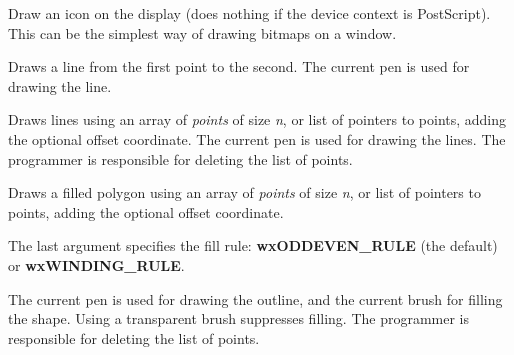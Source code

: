 \label{wxdcdrawicon}


Draw an icon on the display (does nothing if the device context is PostScript).
This can be the simplest way of drawing bitmaps on a window.

\label{wxdcdrawline}


Draws a line from the first point to the second. The current pen is used
for drawing the line.

\label{wxdcdrawlines}



Draws lines using an array of {\it points} of size {\it n}, or list of
pointers to points, adding the optional offset coordinate. The current
pen is used for drawing the lines.  The programmer is responsible for
deleting the list of points.

\label{wxdcdrawpolygon}



Draws a filled polygon using an array of {\it points} of size {\it n},
or list of pointers to points, adding the optional offset coordinate.

The last argument specifies the fill rule: {\bf wxODDEVEN\_RULE} (the
default) or {\bf wxWINDING\_RULE}.

The current pen is used for drawing the outline, and the current brush
for filling the shape.  Using a transparent brush suppresses filling.
The programmer is responsible for deleting the list of points.


